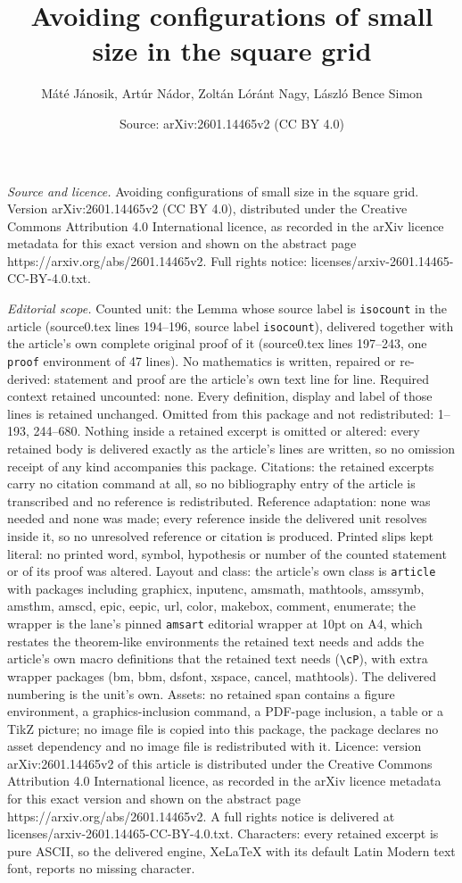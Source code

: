 \documentclass[10pt,a4paper]{amsart}
\title[Avoiding configurations of small size in the square grid]{Avoiding configurations of small size in the square grid}
\author{M\'at\'e J\'anosik, Art\'ur N\'ador, Zolt\'an L\'or\'ant Nagy, L\'aszl\'o Bence Simon}
\date{Source: arXiv:2601.14465v2 (CC BY 4.0)}
\begin{document}
\maketitle

\noindent\emph{Source and licence.} Avoiding configurations of small size in the square grid. Version arXiv:2601.14465v2 (CC BY 4.0), distributed under the Creative Commons Attribution 4.0 International licence, as recorded in the arXiv licence metadata for this exact version and shown on the abstract page https://arxiv.org/abs/2601.14465v2. Full rights notice: licenses/arxiv-2601.14465-CC-BY-4.0.txt.\par\smallskip

\noindent\textit{Editorial scope.} Counted unit: the Lemma whose source label is \texttt{isocount} in the article (source0.tex lines 194--196, source label \texttt{isocount}), delivered together with the article's own complete original proof of it (source0.tex lines 197--243, one \texttt{proof} environment of 47 lines). No mathematics is written, repaired or re-derived: statement and proof are the article's own text line for line. Required context retained uncounted: none. Every definition, display and label of those lines is retained unchanged. Omitted from this package and not redistributed: 1--193, 244--680. Nothing inside a retained excerpt is omitted or altered: every retained body is delivered exactly as the article's lines are written, so no omission receipt of any kind accompanies this package. Citations: the retained excerpts carry no citation command at all, so no bibliography entry of the article is transcribed and no reference is redistributed. Reference adaptation: none was needed and none was made; every reference inside the delivered unit resolves inside it, so no unresolved reference or citation is produced. Printed slips kept literal: no printed word, symbol, hypothesis or number of the counted statement or of its proof was altered. Layout and class: the article's own class is \texttt{article} with packages including graphicx, inputenc, amsmath, mathtools, amssymb, amsthm, amscd, epic, eepic, url, color, makebox, comment, enumerate; the wrapper is the lane's pinned \texttt{amsart} editorial wrapper at 10pt on A4, which restates the theorem-like environments the retained text needs and adds the article's own macro definitions that the retained text needs (\texttt{\textbackslash cP}), with extra wrapper packages (bm, bbm, dsfont, xspace, cancel, mathtools). The delivered numbering is the unit's own. Assets: no retained span contains a figure environment, a graphics-inclusion command, a PDF-page inclusion, a table or a TikZ picture; no image file is copied into this package, the package declares no asset dependency and no image file is redistributed with it. Licence: version arXiv:2601.14465v2 of this article is distributed under the Creative Commons Attribution 4.0 International licence, as recorded in the arXiv licence metadata for this exact version and shown on the abstract page https://arxiv.org/abs/2601.14465v2. A full rights notice is delivered at licenses/arxiv-2601.14465-CC-BY-4.0.txt. Characters: every retained excerpt is pure ASCII, so the delivered engine, XeLaTeX with its default Latin Modern text font, reports no missing character.
\end{document}
